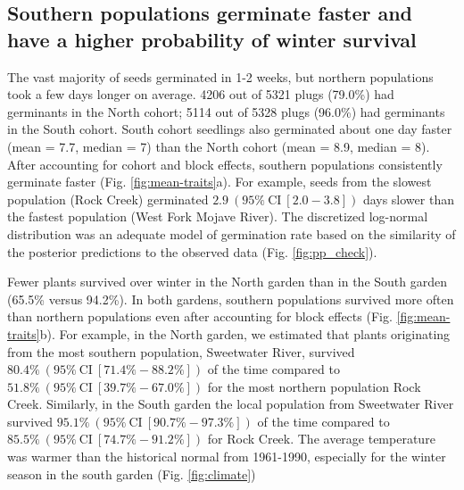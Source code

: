 \documentclass[
  12pt,
]{article}
\begin{document}
\hypertarget{southern-populations-germinate-faster-and-have-a-higher-probability-of-winter-survival}{%
\subsection{Southern populations germinate faster and have a higher probability of winter survival}\label{southern-populations-germinate-faster-and-have-a-higher-probability-of-winter-survival}}

The vast majority of seeds germinated in 1-2 weeks, but northern populations took a few days longer on average. 4206 out of 5321 plugs (79.0\%) had germinants in the North cohort; 5114 out of 5328 plugs (96.0\%) had germinants in the South cohort. South cohort seedlings also germinated about one day faster (mean = 7.7, median = 7) than the North cohort (mean = 8.9, median = 8). After accounting for cohort and block effects, southern populations consistently germinate faster (Fig. \ref{fig:mean-traits}a). For example, seeds from the slowest population (Rock Creek) germinated \(2.9~(95\%~\text{CI}~[2.0-3.8])\) days slower than the fastest population (West Fork Mojave River). The discretized log-normal distribution was an adequate model of germination rate based on the similarity of the posterior predictions to the observed data (Fig. \ref{fig:pp_check}).

Fewer plants survived over winter in the North garden than in the South garden (65.5\% versus 94.2\%). In both gardens, southern populations survived more often than northern populations even after accounting for block effects (Fig. \ref{fig:mean-traits}b). For example, in the North garden, we estimated that plants originating from the most southern population, Sweetwater River, survived \(80.4\%~(95\%~\text{CI}~[71.4\%-88.2\%])\) of the time compared to \(51.8\%~(95\%~\text{CI}~[39.7\%-67.0\%])\) for the most northern population Rock Creek. Similarly, in the South garden the local population from Sweetwater River survived \(95.1\%~(95\%~\text{CI}~[90.7\%-97.3\%])\) of the time compared to \(85.5\%~(95\%~\text{CI}~[74.7\%-91.2\%])\) for Rock Creek. The average temperature was warmer than the historical normal from 1961-1990, especially for the winter season in the south garden (Fig. \ref{fig:climate})
\end{document}
